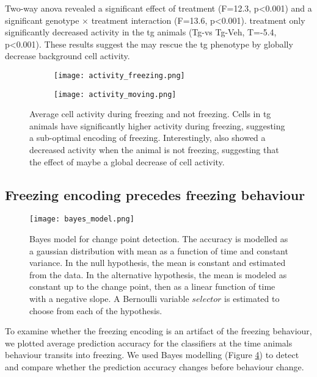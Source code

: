 Two-way \gls{anova} revealed a significant effect of treatment (F=12.3, p<0.001) and a significant genotype $\times$ treatment interaction (F=13.6, p<0.001). \tglu treatment only significantly decreased activity in the \gls{tg} animals (Tg-\glu vs Tg-Veh, T=-5.4, p<0.001). These results suggest the \tglu{} may rescue the \gls{tg} phenotype by globally decrease background cell activity.
\begin{figure}[h]
    \begin{subfigure}[h]{\textwidth}
        \texttt{[image: activity\_freezing.png]}
        \caption{\label{f.ad.actf}}
    \end{subfigure}
    \begin{subfigure}[h]{\textwidth}
        \texttt{[image: activity\_moving.png]}
        \caption{\label{f.ad.actnf}}
    \end{subfigure}
    \caption{Average cell activity during  freezing and  not freezing. Cells in \gls{tg} animals have significantly higher activity during freezing, suggesting a sub-optimal encoding of freezing. Interestingly, \tglu also showed a decreased activity when the animal is not freezing, suggesting that the effect of \tglu maybe a global decrease of cell activity. \label{f.ad.activity_freezing}}
\end{figure}

\subsection{Freezing encoding precedes freezing behaviour}



\begin{figure}[h]
    \texttt{[image: bayes\_model.png]}
    \caption{Bayes model for change point detection. The accuracy is modelled as a gaussian distribution with mean as a function of time and constant variance. In the null hypothesis, the mean is constant and estimated from the data. In the alternative hypothesis, the mean is modeled as constant up to the change point, then as a linear function of time with a negative slope. A Bernoulli variable $selector$ is estimated to choose from each of the hypothesis. \label{f.ad.bayesmodel}}
\end{figure}

To examine whether the freezing encoding is an artifact of the freezing behaviour, we plotted average prediction accuracy for the classifiers at the time animals behaviour transits into freezing. We used Bayes modelling (Figure \ref{f.ad.bayesmodel}) to detect and compare whether the prediction accuracy changes before behaviour change.  


